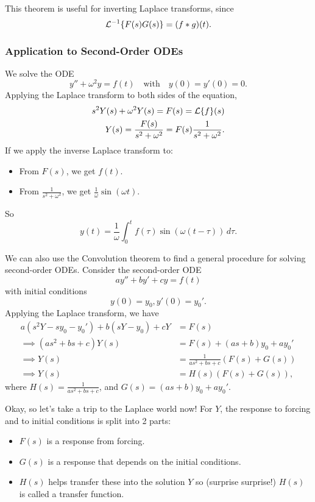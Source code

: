 This theorem is useful for inverting Laplace transforms, since
\[
\mathcal{L}^{-1}\{F(s)G(s)\} = (f*g)(t).
\]

\subsubsection{Application to Second-Order ODEs}

\begin{eg}
	We solve the ODE
	\[
	y'' + \omega^2y = f(t) \quad\text{with}\quad y(0) = y'(0) = 0.
	\]
	Applying the Laplace transform to both sides of the equation,
	\begin{align*}
		s^2Y(s) + \omega^2Y(s) = F(s) = \mathcal{L}\{f\}(s) \\
		Y(s) = \frac{F(s)}{s^2+\omega^2} = F(s) \frac{1}{s^2 + \omega^2}.
	\end{align*}
	If we apply the inverse Laplace transform to:
	\begin{itemize}
		\item From $F(s)$, we get $f(t)$. 
		\item From $\frac{1}{s^2+\omega^2}$, we get $\frac{1}{\omega} \sin(\omega t)$.
	\end{itemize}
	So
	\[
	y(t) = \frac{1}{\omega} \int_0^t f(\tau)\sin\left(\omega(t-\tau)\right) \,d\tau.
	\]
\end{eg}

We can also use the Convolution theorem to find a general procedure for solving second-order ODEs. Consider the second-order ODE
\[
ay'' + by' + cy = f(t)
\]
with initial conditions 
\[
y(0) = y_0, y'(0) = y_0'.
\]
Applying the Laplace transform, we have
\begin{align*}
	a(s^2Y - sy_0 - y_0') + b(sY-y_0)+cY &= F(s) \\
	\implies (as^2+bs+c)Y(s) &= F(s) + (as+b)y_0 + ay_0' \\
	\implies Y(s) &= \frac{1}{as^2+bs+c} \left(F(s) + G(s)\right) \\
	\implies Y(s) &= H(s)\left(F(s)+G(s)\right),
\end{align*}
where $H(s) = \frac{1}{as^2+bs+c}$, and $G(s) = (as+b)y_0 + ay_0'$.

Okay, so let's take a trip to the Laplace world now! For $Y$, the response to forcing and to initial conditions is split into 2 parts:
\begin{itemize}
	\item $F(s)$ is a response from forcing.
	\item $G(s)$ is a response that depends on the initial conditions. 
	\item $H(s)$ helps transfer these into the solution $Y$ so (surprise surprise!) $H(s)$ is called a transfer function.
\end{itemize}

